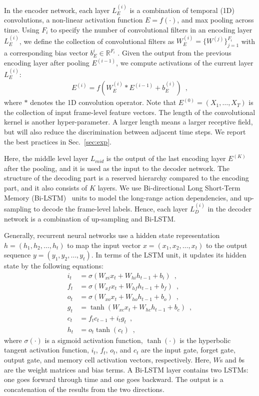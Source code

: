 \documentclass{article}
\begin{document}
In the encoder network, each layer $L_{E}^{(i)}$ is a combination of temporal (1D) convolutions, a non-linear activation function $E = f(\cdot)$, and max pooling across time. Using $F_i$ to specify the number of convolutional filters in an encoding layer $L_{E}^{(i)}$, we define the collection of convolutional filters as $W_E^{(i)} = \{W^{(j)} \}^{F_i}_{j=1}$ with a corresponding bias vector $b_E^{i} \in \mathbb{R}^{F_i}$ . Given the output from the previous encoding layer after pooling $E^{(i-1)}$, we compute activations of the current layer $L_{E}^{(i)}$: 
\begin{align}
E^{(i)} = f(W_E^{(i)} * E^{(i-1)} + b_E^{(i)})
\enspace,
\end{align}
where $*$ denotes the 1D convolution operator. Note that $E^{(0)} = (X_1, \dots, X_T)$ is the collection of input frame-level feature vectors. The length of the convolutional kernel is another hyper-parameter. A larger length means a larger receptive field, but will also reduce the discrimination between adjacent time steps. We report the best practices in Sec.~\ref{sec:exp}.

Here, the middle level layer $L_{mid}$ is the output of the last encoding layer $E^{(K)}$ after the pooling, and it is used as the input to the decoder network. The structure of the decoding part is a reserved hierarchy compared to the encoding part, and it also consists of $K$ layers. We use Bi-directional Long Short-Term Memory (Bi-LSTM)~\cite{graves2005bidirectional} units to model the long-range action dependencies, and up-sampling to decode the frame-level labels. Hence, each layer $L_{D}^{(i)}$ in the decoder network is a combination of up-sampling and Bi-LSTM. 

Generally, recurrent neural networks use a hidden state representation $h = (h_1 , h_2, \dots , h_t)$ to map the input vector $x=(x_1,x_2,\dots,x_t)$ to the output sequence $y=(y_1,y_2,\dots,y_t)$. In terms of the LSTM unit, it updates its hidden state by the following equations: 
\begin{align}
i_t &= \sigma(W_{xi}x_t + W_{hi}h_{t-1} + b_{i}) \enspace, \nonumber\\
f_t &= \sigma(W_{xf}x_t + W_{hf}h_{t-1} + b_{f}) \enspace, \nonumber\\
o_t &= \sigma(W_{xo}x_t + W_{ho}h_{t-1} + b_{o}) \enspace, \nonumber\\
g_t &= \tanh(W_{xc}x_t + W_{hc}h_{t-1} + b_c) \enspace, \nonumber\\
c_t &= f_tc_{t-1} + i_tg_t \enspace, \nonumber\\
h_t &= o_t \tanh(c_t) \enspace, 
\end{align}
where $\sigma(\cdot)$ is a sigmoid activation function, $\tanh(\cdot)$ is the hyperbolic tangent activation function, $i_t$, $f_t$, $o_t$, and $c_t$ are the input gate, forget gate, output gate, and memory cell activation vectors, respectively. Here, $W$s and $b$s are the weight matrices and bias terms. A Bi-LSTM layer contains two LSTMs: one goes forward through time and one goes backward. The output is a concatenation of the results from the two directions. 
\end{document}
